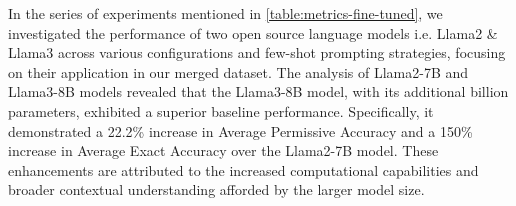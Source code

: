 \documentclass[logo,msc]{infthesis}           %
\begin{document}
In the series of experiments mentioned in \ref{table:metrics-fine-tuned}, we investigated the performance of two open source language models i.e. Llama2 \& Llama3 across various configurations and few-shot prompting strategies, focusing on their application in our merged dataset. The analysis of Llama2-7B and Llama3-8B models revealed that the Llama3-8B model, with its additional billion parameters, exhibited a superior baseline performance. Specifically, it demonstrated a 22.2\% increase in Average Permissive Accuracy and a 150\% increase in Average Exact Accuracy over the Llama2-7B model. These enhancements are attributed to the increased computational capabilities and broader contextual understanding afforded by the larger model size.

\begin{comment}
    
\begin{figure}[h!]
    \centering
    \begin{tikzpicture}
        \begin{axis}[
            width=\textwidth,
            height=0.6\textwidth,
            xlabel={Model},
            ylabel={Score},
            xtick={1,2,3,4,5,6,7},
            xticklabels={Llama2-7B FT, Llama3-8B FT, Llama3-8B CoT, FSP+CoT 1-shot, FSP+CoT 2-shot, FSP+CoT Random, FSP+CoT Mix},
            xticklabel style={rotate=60, anchor=east, yshift=-0.5cm},
            legend style={at={(0.5,1.15)}, anchor=south,legend columns=-1,/tikz/every even column/.append style={column sep=0.5cm}},
            grid=major,
            ymin=0, ymax=1,
            ]

            \addplot[color=blue, mark=*] coordinates {
                (1, 0.46)
                (2, 0.67)
                (3, 0.62)
                (4, 0.62)
                (5, 0.62)
                (6, 0.62)
                (7, 0.62)
            };
            \addlegendentry{Avg Permissive Acc.}

            \addplot[color=orange, mark=*] coordinates {
                (1, 0.00)
                (2, 0.15)
                (3, 0.16)
                (4, 0.16)
                (5, 0.15)
                (6, 0.16)
                (7, 0.16)
            };
            \addlegendentry{Avg Exact Acc.}

            \addplot[color=green, mark=*] coordinates {
                (1, 0.15)
                (2, 0.36)
                (3, 0.38)
                (4, 0.37)
                (5, 0.37)
                (6, 0.37)
                (7, 0.37)
            };
            \addlegendentry{ROUGE Score}


\end{comment}
\end{document}

